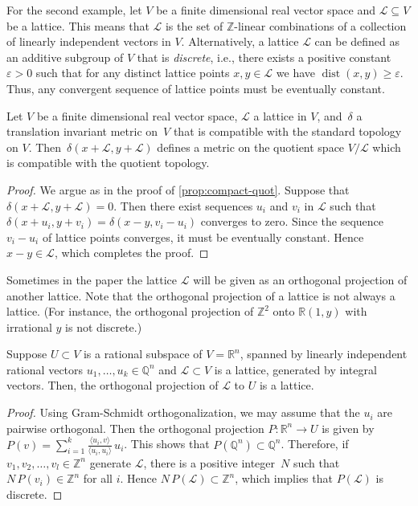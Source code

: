 \documentclass[a4paper,USenglish,cleveref,numberwithinsect]{lipics-v2021}
\DeclareMathOperator{\dist}{dist}
\newcommand{\QQ}{\mathbb{Q}}
\newcommand{\ZZ}{\mathbb{Z}}
\newcommand{\RR}{\mathbb{R}}
\numberwithin{equation}{section}
\begin{document}
For the second example, let $V$ be a finite dimensional real vector space
and $\mathcal{L}\subseteq V$ be a lattice. This means that
$\mathcal{L}$ is the set of $\ZZ$-linear combinations of a collection of
linearly independent vectors in $V$.
Alternatively, a lattice $\mathcal{L}$ can be defined as an additive subgroup of $V$
that is \textit{discrete},
i.e., there exists a positive constant $\varepsilon>0$ such that
for any distinct lattice points $x,y\in\mathcal{L}$ we have
$\dist(x,y)\geq\varepsilon$.
Thus, any convergent sequence of lattice points must be eventually constant.

\begin{proposition}
\label{prop:lattice-quot}
Let $V$ be a finite dimensional real vector space,
$\mathcal{L}$ a lattice in $V$,
and~$\delta$ a translation invariant metric on~$V$ that is compatible with the standard topology on $V$.
Then~$\delta(x+\mathcal{L}, y+\mathcal{L})$ defines a metric on the quotient space
$V/\mathcal{L}$ which is compatible with the quotient topology.
\end{proposition}

\begin{proof}
We argue as in the proof of \cref{prop:compact-quot}.
Suppose that $\delta(x+\mathcal{L},y+\mathcal{L})=0$.
Then there exist sequences $u_i$ and $v_i$ in $\mathcal{L}$ such that
$\delta(x+u_i,y+v_i)= \delta(x-y,v_i-u_i)$ converges to zero.
Since the sequence $v_i-u_i$ of lattice points converges,
it must be eventually constant. Hence $x-y\in\mathcal{L}$,
which completes the proof.
\end{proof}

Sometimes in the paper the lattice $\mathcal{L}$ will be given
as an orthogonal projection of another lattice.
Note that the orthogonal projection of a lattice is not always a lattice.
(For instance, the orthogonal projection of $\ZZ^2$ onto
$\RR(1,y)$ with irrational $y$ is not discrete.)

\begin{lemma}\label{lem:ort-proj-lattice}
Suppose $U\subset V$ is a rational subspace of $V=\RR^n$,
spanned by linearly independent rational vectors
$u_1,\dots,u_k\in\QQ^n$ and $\mathcal{L}\subset V$ is a lattice, generated by integral vectors.
Then, the orthogonal projection of $\mathcal{L}$ to $U$ is a lattice. %
\end{lemma}

\begin{proof}
Using Gram-Schmidt orthogonalization,
we may assume that the $u_i$ are pairwise orthogonal.
Then the orthogonal projection
$P:\RR^n\rightarrow U$ is given by
$P(v) = \sum_{i=1}^k \frac{\langle u_i, v\rangle}{\langle u_i,u_i \rangle} \, u_i$.
This shows that $P(\QQ^n)\subset\QQ^n$.
Therefore, if $v_1,v_2,\dots,v_l\in\ZZ^n$ generate $\mathcal{L}$,
there is a positive integer~$N$ such that $N\, P(v_i)\in\ZZ^n$ for all $i$.
Hence  $N\,P(\mathcal{L})\subset\ZZ^n$, which
implies that $P(\mathcal{L})$ is discrete. %
\end{proof}
\end{document}

